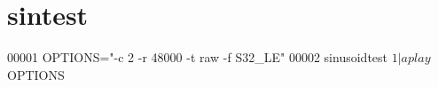 \hypertarget{sintest_source}{\section{sintest}
\label{sintest_source}
}

\begin{DoxyCode}
00001 OPTIONS="-c 2 -r 48000 -t raw -f S32\_LE"
00002 sinusoidtest $1 | aplay $OPTIONS
\end{DoxyCode}
